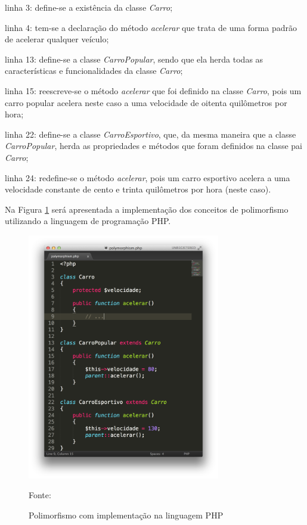 \begin{alineas}
    \item linha 3: define-se a existência da classe \textit{Carro};
    \item linha 4: tem-se a declaração do método \textit{acelerar} que trata de
    uma forma padrão de acelerar qualquer veículo;
    \item linha 13: define-se a classe \textit{CarroPopular}, sendo que ela
    herda todas as características e funcionalidades da classe \textit{Carro};
    \item linha 15: reescreve-se o método \textit{acelerar} que foi definido na
    classe \textit{Carro}, pois um carro popular acelera neste caso a uma
    velocidade de oitenta quilômetros por hora;
    \item linha 22: define-se a classe \textit{CarroEsportivo}, que, da mesma
    maneira que a classe \textit{CarroPopular}, herda as propriedades e métodos
    que foram definidos na classe pai \textit{Carro};
    \item linha 24: redefine-se o método \textit{acelerar}, pois um carro
    esportivo acelera a uma velocidade constante de cento e trinta quilômetros
    por hora (neste caso).
\end{alineas}

Na Figura \ref{fig:polimorfismo} será apresentada a implementação dos conceitos
de polimorfismo utilizando a linguagem de programação \acs{PHP}.

\begin{figure}[h!tb]
	\caption{Polimorfismo com implementação na linguagem PHP}
	\label{fig:polimorfismo}

	\centering
	\includegraphics[width=0.75\textwidth]{images/polymorphism.png}

	\centering
	\footnotesize Fonte: \fonteOAutor
\end{figure}

